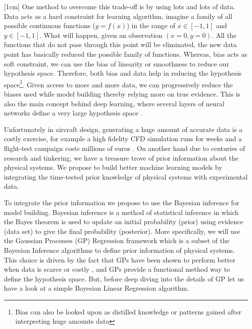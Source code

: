 [1cm]
One method to overcome this trade-off is by using lots and lots of data. Data acts as a hard constraint for learning algorithm, imagine a family of all possible continuous functions ($y = f(x)$) in the range of $x \in [-1, 1]$ and $y \in [-1, 1]$. What will happen, given an observation $(x = 0, y = 0)$. All the functions that do not pass through this point will be eliminated, the new data point has basically reduced the possible family of functions. Whereas, bias acts as soft constraint, we can use the bias of linearity or smoothness to reduce our hypothesis space. Therefore, both bias and data help in reducing the hypothesis space\footnote{Bias can also be looked upon as distilled knowledge or patterns gained after interpreting huge amounts data}. Given access to more and more data, we can progressively reduce the biases used while model building thereby relying more on true evidence. This is also the main concept behind deep learning, where several layers of neural networks define a very large hypothesis space \cite{Goodfellow-et-al-2016, lecun2015deep}. 

Unfortunately in aircraft design, generating a huge amount of accurate data is a costly exercise, for example a high fidelity CFD simulation runs for weeks \cite{murthy2014computational, jameson2012computational, forrester2008engineering} and a flight-test campaign costs millions of euros \cite{fox2004test}. On another hand due to centuries of research and tinkering, we have a treasure trove of prior information about the physical systems. We propose to build better machine learning models by integrating the time-tested prior knowledge of physical systems with experimental data. 

To integrate the prior information we propose to use the Bayesian inference for model building. Bayesian inference is a method of statistical inference in which the Bayes theorem is used to update an initial probability (prior) using evidence (data set) to give the final probability (posterior). More specifically, we will use the Gaussian Processes (GP) Regression framework which is a subset of the Bayesian Inference algorithms to define prior information of physical systems. This choice is driven by the fact that GPs have been shown to perform better when data is scarce or costly \cite{Stein1999Springer}, and GPs provide a functional method way to define the hypothesis space. But, before deep diving into the details of GP let us have a look at a simple Bayesian Linear Regression algorithm.

